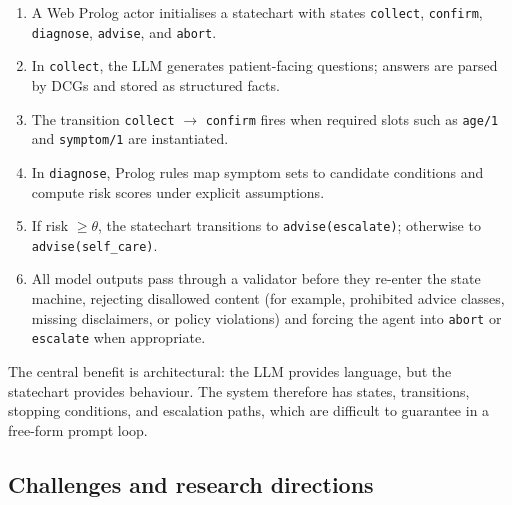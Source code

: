 \begin{enumerate}
\item A Web Prolog actor initialises a statechart with states \texttt{collect}, \texttt{confirm}, \texttt{diagnose}, \texttt{advise}, and \texttt{abort}.
\item In \texttt{collect}, the LLM generates patient-facing questions; answers are parsed by DCGs and stored as structured facts.
\item The transition \texttt{collect} $\rightarrow$ \texttt{confirm} fires when required slots such as \texttt{age/1} and \texttt{symptom/1} are instantiated.
\item In \texttt{diagnose}, Prolog rules map symptom sets to candidate conditions and compute risk scores under explicit assumptions.
\item If risk $\ge \theta$, the statechart transitions to \texttt{advise(escalate)}; otherwise to \texttt{advise(self\_care)}.
\item All model outputs pass through a validator before they re-enter the state machine, rejecting disallowed content (for example, prohibited advice classes, missing disclaimers, or policy violations) and forcing the agent into \texttt{abort} or \texttt{escalate} when appropriate.
\end{enumerate}

\noindent The central benefit is architectural: the LLM provides language, but the statechart provides behaviour. The system therefore has states, transitions, stopping conditions, and escalation paths, which are difficult to guarantee in a free-form prompt loop.

\subsection{Challenges and research directions}
\label{sec:neuro-symbolic-challenges}

